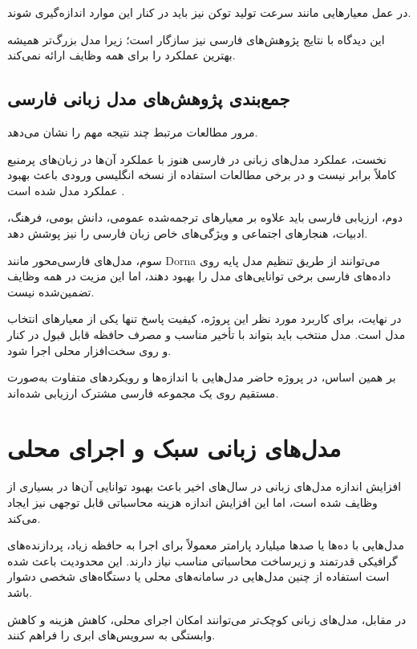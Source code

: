در عمل معیارهایی مانند سرعت تولید توکن نیز باید در کنار این
موارد اندازه‌گیری شوند.

این دیدگاه با نتایج پژوهش‌های فارسی نیز سازگار است؛ زیرا
مدل بزرگ‌تر همیشه بهترین عملکرد را برای همه وظایف ارائه
نمی‌کند.


\subsection{جمع‌بندی پژوهش‌های مدل زبانی فارسی}

مرور مطالعات مرتبط چند نتیجه مهم را نشان می‌دهد.

نخست، عملکرد مدل‌های زبانی در فارسی هنوز با عملکرد آن‌ها
در زبان‌های پرمنبع کاملاً برابر نیست و در برخی مطالعات
استفاده از نسخه انگلیسی ورودی باعث بهبود عملکرد مدل شده است
\cite{abaskohi2024persianllm}.

دوم، ارزیابی فارسی باید علاوه بر معیارهای ترجمه‌شده عمومی،
دانش بومی، فرهنگ، ادبیات، هنجارهای اجتماعی و ویژگی‌های خاص
زبان فارسی را نیز پوشش دهد.

سوم، مدل‌های فارسی‌محور مانند Dorna می‌توانند از طریق تنظیم
مدل پایه روی داده‌های فارسی برخی توانایی‌های مدل را بهبود
دهند، اما این مزیت در همه وظایف تضمین‌شده نیست.

در نهایت، برای کاربرد مورد نظر این پروژه، کیفیت پاسخ تنها
یکی از معیارهای انتخاب مدل است.
مدل منتخب باید بتواند با تأخیر مناسب و مصرف حافظه قابل قبول
در کنار  و  روی سخت‌افزار محلی اجرا شود.

بر همین اساس، در پروژه حاضر مدل‌هایی با اندازه‌ها و رویکردهای
متفاوت به‌صورت مستقیم روی یک مجموعه فارسی مشترک ارزیابی
شده‌اند.
\section{مدل‌های زبانی سبک و اجرای محلی}

افزایش اندازه مدل‌های زبانی در سال‌های اخیر باعث بهبود توانایی
آن‌ها در بسیاری از وظایف شده است، اما این افزایش اندازه هزینه
محاسباتی قابل توجهی نیز ایجاد می‌کند.

مدل‌هایی با ده‌ها یا صدها میلیارد پارامتر معمولاً برای اجرا به
حافظه زیاد، پردازنده‌های گرافیکی قدرتمند و زیرساخت محاسباتی
مناسب نیاز دارند.
این محدودیت باعث شده است استفاده از چنین مدل‌هایی در
سامانه‌های محلی یا دستگاه‌های شخصی دشوار باشد.

در مقابل، مدل‌های زبانی کوچک‌تر می‌توانند امکان اجرای محلی،
کاهش هزینه و کاهش وابستگی به سرویس‌های ابری را فراهم کنند.


